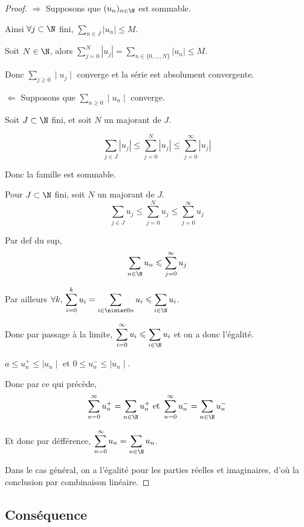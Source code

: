 \begin{proof}
    $\Rightarrow$ Supposons que $(u_n)_{n \in \N}$ est sommable. 

    Ainsi $\forall j \subset \N$ fini, $\displaystyle \sum_{n \in J} |u_n| \leqslant M$.

    Soit $N \in \N$, alors $\displaystyle \sum_{j = 0 }^N |u_j|  = \sum_{n \in \{0, \ldots, N\}} |u_n| \leqslant M$.

    Donc $\sum_{j \geqslant 0} \mid u_j \mid$ converge et la série est absolument convergente. 

    \lvspace $\Leftarrow$ Supposons que $\sum_{n \geqslant 0} \mid u_n \mid $ converge. 

    Soit $J \subset \N$ fini, et soit $N$ un majorant de $J$. 

    $$\sum_{j \in J} |u_j| \leqslant \sum_{j = 0}^N |u_j| \leqslant \sum_{j = 0}^\infty |u_j|$$

    Donc la famille est sommable. 


    Pour $J \subset \N$ fini, soit $N$ un majorant de $J$. 
    $$\sum_{j \in J} u_j \leqslant \sum_{j = 0}^N u_j \leqslant \sum_{j = 0}^\infty u_j$$

    Par def du sup, 
    $$\sum_{n \in \N} u_n \leqslant \sum_{j = 0 }^{\infty } u_j$$

    Par ailleurs $\forall k, \, \displaystyle \sum_{i = 0}^k u_i  = \sum_{i \in \ninter 0 n} u_i \leqslant \sum_{i \in \N} u_i$.

    Donc par passage à la limite, $\displaystyle \sum_{i = 0}^\infty u_i \leqslant \sum_{i \in \N} u_i$ et on a donc l'égalité. 


    \svspace $a \leqslant u_n^+ \leqslant \mid u_n \mid$ et $0 \leqslant u_n^- \leqslant \mid u_n \mid$.

    Donc par ce qui précède, 
    $$\sum_{n = 0}^\infty u_n^+ = \sum_{n \in \N} u_n^+ \text{ et } \sum_{n = 0}^\infty u_n^- = \sum_{n \in \N} u_n^-$$

    Et donc par défférence, $\displaystyle \sum_{n = 0}^\infty u_n = \sum_{n \in \N} u_n$.

    Dans le cas général, on a l'égalité pour les parties réelles et imaginaires, d'où la conclusion 
    par combinaison linéaire. 
\end{proof}

\subsection{Conséquence }

